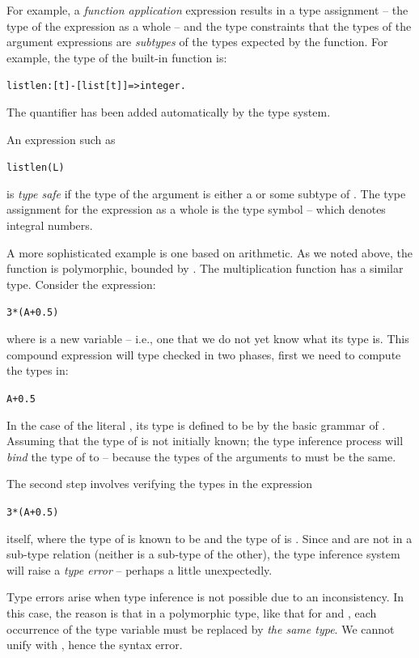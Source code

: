 For example, a \emph{function application} expression results in a type assignment -- the type of the expression as a whole -- and the type constraints that the types of the argument expressions are \emph{subtypes} of the types expected by the function. For example, the type of the  built-in function is:
\begin{alltt}
listlen:[t]-[list[t]]=>integer.
\end{alltt}
The quantifier has been added automatically by the type system.

An expression such as
\begin{alltt}
listlen(L)
\end{alltt}
is \emph{type safe} if the type of the argument  is either a  or some subtype of . The type assignment for the expression as a whole is the type symbol  -- which denotes integral numbers.

A more sophisticated example is one based on arithmetic. As we noted above, the \q{+} function is polymorphic, bounded by . The \q{*} multiplication function has a similar type. Consider the expression:
\begin{alltt}
3*(A+0.5)
\end{alltt}
where  is a new variable -- i.e., one that we do not yet know what its type is. This compound expression will type checked in two phases, first we need to compute the types in:
\begin{alltt}
A+0.5
\end{alltt}

In the case of the literal , its type is defined to be  by the basic grammar of \go. Assuming that the type of  is not initially known; the type inference process will \emph{bind} the type of  to  -- because the types of the arguments to \q{+} must be the same.

The second step involves verifying the types in the expression
\begin{alltt}
3*(A+0.5)
\end{alltt}
itself, where the type of  is known to be  and the type of  is . Since  and  are not in a sub-type relation (neither is a sub-type of the other), the type inference system will raise a \emph{type error} -- perhaps a little unexpectedly.

Type errors arise when type inference is not possible due to an inconsistency. In this case, the reason is that in a polymorphic type, like that for \q{+} and \q{*}, each occurrence of the type variable must be replaced by \emph{the same type}. We cannot unify  with , hence the syntax error.

